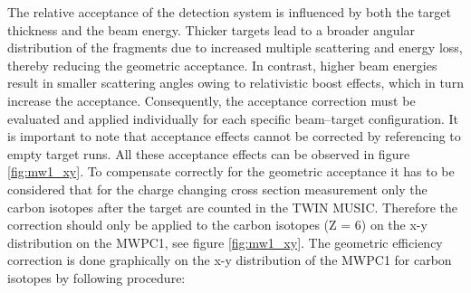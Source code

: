 The relative acceptance of the detection system is influenced by both the target thickness and the beam energy. Thicker targets lead to a broader angular distribution of the fragments due to increased multiple scattering and energy loss, thereby reducing the geometric acceptance. In contrast, higher beam energies result in smaller scattering angles owing to relativistic boost effects, which in turn increase the acceptance. Consequently, the acceptance correction must be evaluated and applied individually for each specific beam–target configuration. It is important to note that acceptance effects cannot be corrected by referencing to empty target runs. All these acceptance effects can be observed in figure \ref{fig:mw1_xy}.\newline
To compensate correctly for the geometric acceptance it has to be considered that for the charge changing cross section measurement only the carbon isotopes after the target are counted in the TWIN MUSIC. Therefore the correction should only be applied to the carbon isotopes (Z = 6) on the x-y distribution on the MWPC1, see figure \ref{fig:mw1_xy}. The geometric efficiency correction is done graphically on the x-y distribution of the MWPC1 for carbon isotopes by following procedure:
